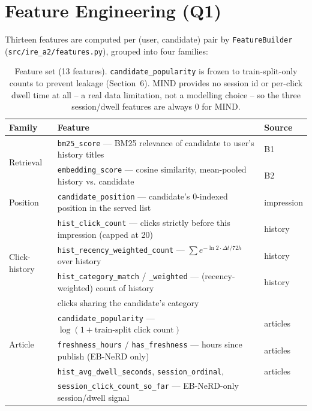 \documentclass[11pt,a4paper]{article}
\begin{document}
\section{Feature Engineering (Q1)}

Thirteen features are computed per (user, candidate) pair by \texttt{FeatureBuilder}
(\texttt{src/ire\_a2/}\allowbreak\texttt{features.py}), grouped into four families:

\begin{table}[h]
\centering\small
\begin{tabularx}{\textwidth}{lXl}
\toprule
\textbf{Family} & \textbf{Feature} & \textbf{Source} \\
\midrule
\multirow{2}{*}{Retrieval}
 & \texttt{bm25\_score} --- BM25 relevance of candidate to user's history titles & B1 \\
 & \texttt{embedding\_score} --- cosine similarity, mean-pooled history vs. candidate & B2 \\
\midrule
Position
 & \texttt{candidate\_position} --- candidate's 0-indexed position in the served list & impression \\
\midrule
\multirow{4}{*}{Click-history}
 & \texttt{hist\_click\_count} --- clicks strictly before this impression (capped at 20) & history \\
 & \texttt{hist\_recency\_weighted\_count} --- $\sum e^{-\ln2 \cdot \Delta t / 72h}$ over history & history \\
 & \texttt{hist\_category\_match} / \texttt{\_weighted} --- (recency-weighted) count of history & history \\
 & \quad clicks sharing the candidate's category & \\
\midrule
\multirow{3}{*}{Article}
 & \texttt{candidate\_popularity} --- $\log(1{+}\text{train-split click count})$ & articles \\
 & \texttt{freshness\_hours} / \texttt{has\_freshness} --- hours since publish (EB-NeRD only) & articles \\
 & \texttt{hist\_avg\_dwell\_seconds}, \texttt{session\_ordinal}, & articles \\
 & \quad \texttt{session\_click\_count\_so\_far} --- EB-NeRD-only session/dwell signal & \\
\bottomrule
\end{tabularx}
\caption{Feature set (13 features). \texttt{candidate\_popularity} is frozen to
train-split-only counts to prevent leakage (Section~6). MIND provides no session id or
per-click dwell time at all -- a real data limitation, not a modelling choice -- so the
three session/dwell features are always 0 for MIND.}
\label{tab:features}
\end{table}
\end{document}
